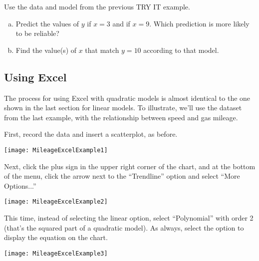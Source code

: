 \begin{try}
Use the data and model from the previous TRY IT example.

\begin{enumerate}[(a)]
\item Predict the values of $y$ if $x=3$ and if $x=9$.  Which prediction is more likely to be reliable?
\item Find the value(s) of $x$ that match $y=10$ according to that model.
\end{enumerate}
\end{try}

\subsection{Using Excel}
The process for using Excel with quadratic models is almost identical to the one shown in the last section for linear models.  To illustrate, we'll use the dataset from the last example, with the relationship between speed and gas mileage.

First, record the data and insert a scatterplot, as before.
\begin{center}
\texttt{[image: MileageExcelExample1]}
\end{center}

Next, click the plus sign in the upper right corner of the chart, and at the bottom of the menu, click the arrow next to the ``Trendline'' option and select ``More Options...''
\begin{center}
\texttt{[image: MileageExcelExample2]}
\end{center}

This time, instead of selecting the linear option, select ``Polynomial'' with order 2 (that's the squared part of a quadratic model).  As always, select the option to display the equation on the chart.
\begin{center}
\texttt{[image: MileageExcelExample3]}
\end{center}